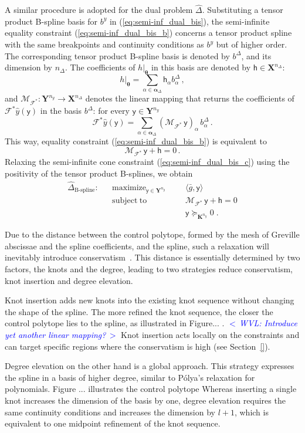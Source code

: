 \documentclass{article}
\DeclareMathOperator*{\maximize}{maximize}
\DeclareMathOperator*{\subj}{subject\;to}
\newcommand{\commentWVL}[1]{\noindent \textcolor{blue}{\emph{$<\,$WVL: #1$\,>$}}}%
\newcommand{\adj}{\ast}                     %
\newcommand{\Ppar}{{\bm{\theta}}}                   %
\newcommand{\X}{\mathbf{X}}                         %
\newcommand{\Y}{\mathbf{Y}}                         %
\newcommand{\K}{\mathbf{K}}                         %
\newcommand{\calF}{\mathcal{F}}                     %
\newcommand{\by}{b^y}               %
\newcommand{\cy}{\textsf{y}}        %
\newcommand{\ny}{{n_y}}             %
\newcommand{\Alpha}{\bm{\alpha}}    %
\newcommand{\meang}{\bar{g}}        %
\newcommand{\bDelta}{b^\Delta}          %
\newcommand{\bDeltaa}{b^\Delta_\alpha}  %
\newcommand{\nDelta}{{n_\Delta}}        %
\newcommand{\ch}{\textsf{h}}            %
\newcommand{\cha}{\textsf{h}_\alpha}    %
\newcommand{\calMFadj}{\mathcal{M}_{\mathcal{F}^\adj}}
\begin{document}
A similar procedure is adopted for the dual problem $\hat{\Delta}$. Substituting a tensor product B-spline basis for $\by$ in (\ref{eq:semi-inf_dual_bis}), the semi-infinite equality constraint (\ref{eq:semi-inf_dual_bis_b}) concerns a tensor product spline with the same breakpoints and continuity conditions as $\by$ but of higher order. The corresponding tensor product B-spline basis is denoted by $\bDelta$, and its dimension by $\nDelta$. The coefficients of $h|_\Ppar$ in this basis are denoted by $\ch\in\X^\nDelta$:
\[ h|_\Ppar = \sum_{\alpha\in\Alpha_\Delta} \cha \bDeltaa \,,%
\]
and $\calMFadj:\Y^\ny \rightarrow \X^\nDelta$ denotes the linear mapping that returns the coefficients of $\calF^\adj\hat{y}(\cy)$ in the basis $\bDelta$: for every $\cy\in\Y^\ny$
\[ \calF^\adj \hat{y}(\cy) = \sum_{\alpha\in\Alpha_\Delta} (\calMFadj \, \cy)_\alpha \, \bDeltaa\,. %
\]
This way, equality constraint (\ref{eq:semi-inf_dual_bis_b}) is equivalent to
\[ \calMFadj\,\cy + \ch = 0 \,.
\]
Relaxing the semi-infinite cone constraint (\ref{eq:semi-inf_dual_bis_c}) using the positivity of the tensor product B-splines, we obtain
\[\begin{aligned}
\hat{\Delta}_{\text{B-spline}}: && \maximize_{\cy\in\Y^\ny} &&& \langle \meang, \cy \rangle \\%
                                && \subj                    &&& \calMFadj\,\cy + \ch = 0 \\%
                                &&                          &&& \cy \succeq_{\K^\ny} 0     \;.%
\end{aligned}\]

Due to the distance between the control polytope, formed by the mesh of
Greville abscissae and the spline coefficients, and the spline, such a
relaxation will inevitably introduce conservatism~\cite{deboor}. This distance
is essentially determined by two factors, the knots and the degree, leading to
two strategies reduce conservatism, knot insertion and degree elevation.

Knot insertion adds new knots into the existing knot sequence without changing
the shape of the spline. The more refined the knot sequence, the closer the
control polytope lies to the spline, as illustrated in Figure... .
\commentWVL{Introduce yet another linear mapping?} Knot insertion acts locally
on the constraints and can target specific regions where the conservatism is
high (see Section~\ref{}).

Degree elevation on the other hand is a global approach. This strategy
expresses the spline in a basis of higher degree, similar to P\'olya's
relaxation for polynomials. Figure ... illustrates the control polytope  Whereas inserting a single
knot increases the dimension of the basis by one, degree elevation requires the
same continuity conditions and increases the dimension by $l+1$, which is
equivalent to one midpoint refinement of the knot sequence.
\end{document}
